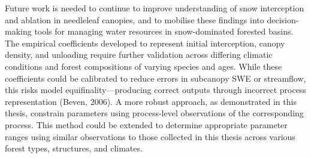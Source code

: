 \documentclass[
  letterpaper,
]{tex/uofsthesis-cs}
\begin{document}
Future work is needed to continue to improve understanding of snow
interception and ablation in needleleaf canopies, and to mobilise these
findings into decision-making tools for managing water resources in
snow-dominated forested basins. The empirical coefficients developed to
represent initial interception, canopy density, and unloading require
further validation across differing climatic conditions and forest
compositions of varying species and ages. While these coefficients could
be calibrated to reduce errors in subcanopy SWE or streamflow, this
risks model equifinality---producing correct outputs through incorrect
process representation (Beven, 2006). A more robust approach, as
demonstrated in this thesis, constrain parameters using process-level
observations of the corresponding process. This method could be extended
to determine appropriate parameter ranges using similar observations to
those collected in this thesis across various forest types, structures,
and climates.
\end{document}
